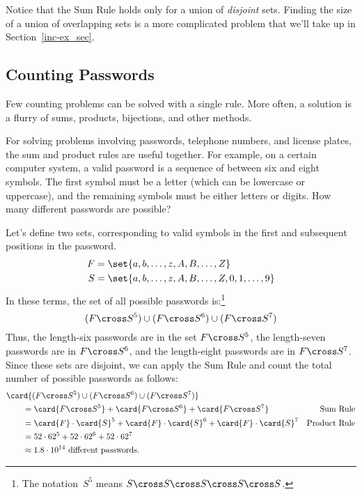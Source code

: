 Notice that the Sum Rule holds only for a union of \emph{disjoint}
sets.  Finding the size of a union of overlapping sets is a more
complicated problem that we'll take up in Section~\ref{inc-ex_sec}.

\subsection{Counting Passwords}

Few counting problems can be solved with a single rule.  More often, a
solution is a flurry of sums, products, bijections, and other methods.

For solving problems involving passwords, telephone numbers, and
license plates, the sum and product rules are useful together.  For
example, on a certain computer system, a valid password is a sequence
of between six and eight symbols.  The first symbol must be a letter
(which can be lowercase or uppercase), and the remaining symbols must
be either letters or digits.  How many different passwords are
possible?

Let's define two sets, corresponding to valid symbols in the first and
subsequent positions in the password.
%
\begin{align*}
F & = \set{ a, b, \ldots, z, A, B, \ldots, Z } \\
S & = \set{ a, b, \ldots, z, A, B, \ldots, Z, 0, 1, \ldots, 9 }
\end{align*}
%
In these terms, the set of all possible passwords is:\footnote{The
  notation~$S^5$ means $S \cross S \cross S \cross S \cross S$.}
%
\[
(F \cross S^5) \cup (F \cross S^6) \cup (F \cross S^7)
\]
%
Thus, the length-six passwords are in the set $F \cross S^5$, the
length-seven passwords are in $F \cross S^6$, and the length-eight
passwords are in $F \cross S^7$.  Since these sets are disjoint, we
can apply the Sum Rule and count the total number of possible
passwords as follows:
%
\begin{align*}
\lefteqn{\card{(F \cross S^5) \cup (F \cross S^6) \cup (F \cross S^7)}}
\qquad & \\
    & = \card{F \cross S^5} + \card{F \cross S^6} + \card{F \cross S^7}
        & \text{Sum Rule} \\
    & = \card{F} \cdot \card{S}^5 +
          \card{F} \cdot \card{S}^6 +
          \card{F} \cdot \card{S}^7
        & \text{Product Rule} \\
    & = 52 \cdot 62^5 + 52 \cdot 62^6 + 52 \cdot 62^7 \\
    & \approx 1.8 \cdot 10^{14} \text{ different passwords}.
\end{align*}


